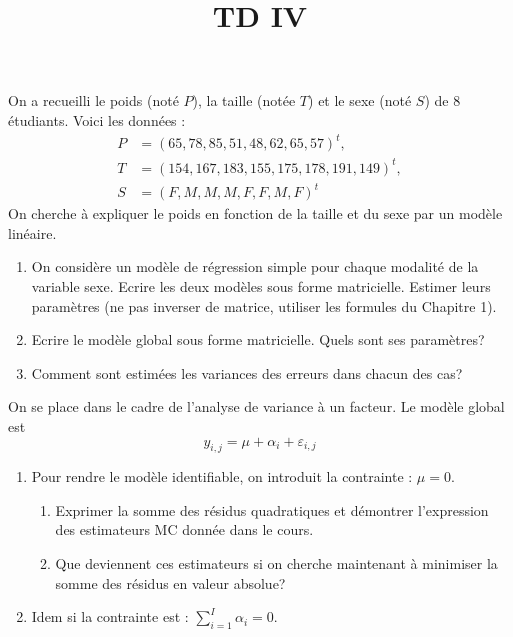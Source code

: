 \documentclass{td_um}
\title{TD IV}
\providecommand{\1}{\mathds{1}}
\begin{document}
\maketitle

\exo{} On a recueilli le poids (noté $P$), la taille (notée $T$) et le sexe (noté $S$) de $8$ étudiants. Voici les données : 
\begin{align*}
    P&=(65,78,85,51,48,62,65,57)^{t},\\ 
    T&=(154,167,183,155,175,178,191,149)^{t}, \\ 
    S&=(F, M, M, M, F, F, M, F)^{t}
\end{align*}
On cherche à expliquer le poids en fonction de la taille et du sexe par un modèle linéaire.
\begin{enumerate}
    \item  On considère un modèle de régression simple pour chaque modalité de la variable sexe. Ecrire les deux modèles sous forme matricielle. Estimer leurs paramètres (ne pas inverser de matrice, utiliser les formules du Chapitre 1).
    \item  Ecrire le modèle global sous forme matricielle. Quels sont ses paramètres?
    \item  Comment sont estimées les variances des erreurs dans chacun des cas?
\end{enumerate}

\cor{\newpage}

\exo{}On se place dans le cadre de l'analyse de variance à un facteur. Le modèle global est
\[
y_{i, j}=\mu+\alpha_{i}+\varepsilon_{i, j}
\]
\begin{enumerate}
    \item  Pour rendre le modèle identifiable, on introduit la contrainte : $\mu=0$.
        \begin{enumerate}
            \item  Exprimer la somme des résidus quadratiques et démontrer l'expression des estimateurs MC donnée dans le cours.
            \item  Que deviennent ces estimateurs si on cherche maintenant à minimiser la somme des résidus en valeur absolue?
        \end{enumerate}
    \item  Idem si la contrainte est : $\sum_{i=1}^{I} \alpha_{i}=0$.
\end{enumerate}


\cor{\newpage}
\end{document}
